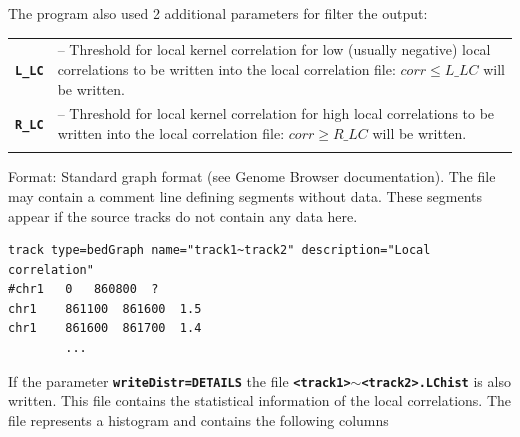 \documentclass{article}
\newcommand{\tw}{\textwidth}
\newcommand{\prm}[1]{\texttt{\textbf{{#1}}}}
\begin{document}
The program also used 2 additional parameters for filter the output:

\begin{tabular}{ll}\\
\prm{L\_LC} & -- Threshold for local kernel correlation  for low (usually negative) local correlations to be written 
        into the local correlation file:  $corr \leq L\_LC$ will be written. \\
\prm{R\_LC} & -- Threshold for local kernel correlation for high local correlations to be written into the 
        local correlation file:  $corr \geq R\_LC$ will be written. \\ \\
\end{tabular}

Format: Standard graph format (see Genome Browser documentation). The file may contain a comment line defining segments without data. These segments appear if the source tracks do not contain any data here.
 
\begin{minipage}{0.75\tw}
\begin{shaded} 
\begin{verbatim}
track type=bedGraph name="track1~track2" description="Local correlation"
#chr1	0	860800	?
chr1	861100	861600	1.5
chr1	861600	861700	1.4
        ...
\end{verbatim}
\end{shaded}
\end{minipage}

If the parameter \prm{writeDistr=DETAILS} the file \prm{<track1>$\sim$<track2>.LChist} is also written.  This file contains the statistical information of the local correlations. 
The file represents a histogram and contains the following columns
\end{document}
